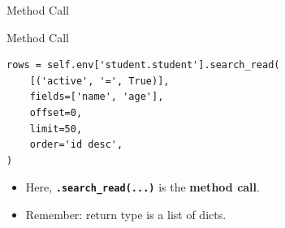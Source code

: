 \begin{frame}[fragile]{Method Call}
\begin{block}{Method Call}
\begin{lstlisting}
rows = self.env['student.student'].search_read(
	[('active', '=', True)],
	fields=['name', 'age'],
	offset=0,
	limit=50,
	order='id desc',
)
\end{lstlisting}
	\begin{itemize}
		\item Here, \textbf{\texttt{.search\_read(...)}} is the \textbf{method call}.
		\item Remember: return type is a list of dicts.
	\end{itemize}
\end{block}
\end{frame}
